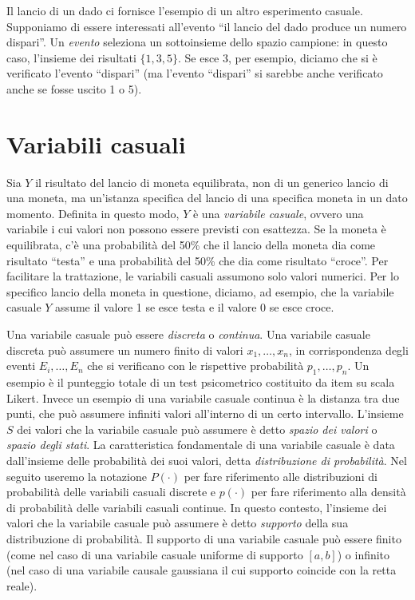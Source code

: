 \documentclass[
  11pt,
]{krantz}
\theoremstyle{definition}
\theoremstyle{definition}
\theoremstyle{definition}
\theoremstyle{definition}
\theoremstyle{remark}
\begin{document}
Il lancio di un dado ci fornisce l'esempio di un altro esperimento casuale. Supponiamo di essere interessati all'evento ``il lancio del dado produce un numero dispari''. Un \emph{evento} seleziona un sottoinsieme dello spazio campione: in questo caso, l'insieme dei risultati \(\{1, 3, 5\}\). Se esce 3, per esempio, diciamo che si è verificato l'evento ``dispari'' (ma l'evento ``dispari'' si sarebbe anche verificato anche se fosse uscito 1 o 5).

\hypertarget{variabili-casuali}{%
\section{Variabili casuali}\label{variabili-casuali}}

Sia \(Y\) il risultato del lancio di moneta equilibrata, non di un generico lancio di una moneta, ma un'istanza specifica del lancio di una specifica moneta in un dato momento. Definita in questo modo, \(Y\) è una \emph{variabile casuale}, ovvero una variabile i cui valori non possono essere previsti con esattezza. Se la moneta è equilibrata, c'è una probabilità del 50\% che il lancio della moneta dia come risultato ``testa'' e una probabilità del 50\% che dia come risultato ``croce''. Per facilitare la trattazione, le variabili casuali assumono solo valori numerici. Per lo specifico lancio della moneta in questione, diciamo, ad esempio, che la variabile casuale \(Y\) assume il valore 1 se esce testa e il valore 0 se esce croce.

Una variabile casuale può essere \emph{discreta} o \emph{continua}. Una variabile casuale discreta può assumere un numero finito di valori \(x_1, \dots ,x_n\), in corrispondenza degli eventi \(E_i, \dots, E_n\) che si verificano con le rispettive probabilità \(p_1, \dots, p_n\). Un esempio è il punteggio totale di un test psicometrico costituito da item su scala Likert. Invece un esempio di una variabile casuale continua è la distanza tra due punti, che può assumere infiniti valori all'interno di un certo intervallo. L'insieme \(S\) dei valori che la variabile casuale può assumere è detto \emph{spazio dei valori} o \emph{spazio degli stati}. La caratteristica fondamentale di una variabile casuale è data dall'insieme delle probabilità dei suoi valori, detta \emph{distribuzione di probabilità}. Nel seguito useremo la notazione \(P(\cdot)\) per fare riferimento alle distribuzioni di probabilità delle variabili casuali discrete e \(p(\cdot)\) per fare riferimento alla densità di probabilità delle variabili casuali continue. In questo contesto, l'insieme dei valori che la variabile casuale può assumere è detto \emph{supporto} della sua distribuzione di probabilità. Il supporto di una variabile casuale può essere finito (come nel caso di una variabile casuale uniforme di supporto \([a, b]\)) o infinito (nel caso di una variabile causale gaussiana il cui supporto coincide con la retta reale).
\end{document}
